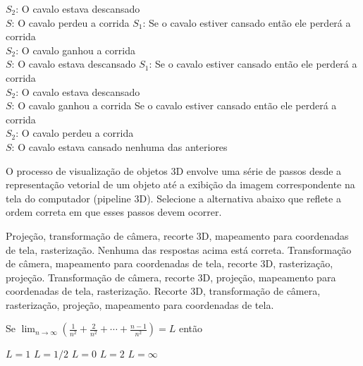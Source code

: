 \documentclass[12pt, addpoints]{exam}
\begin{document}
\begin{questions}
\begin{choices}
              \( S_2 \): O cavalo estava descansado \\

              \( S \): O cavalo perdeu a corrida
\choice \( S_1 \): Se o cavalo estiver cansado então ele perderá a corrida \\

              \( S_2 \): O cavalo ganhou a corrida \\

              \( S \): O cavalo estava descansado
\choice \( S_1 \): Se o cavalo estiver cansado então ele perderá a corrida \\

              \( S_2 \): O cavalo estava descansado \\

              \( S \): O cavalo ganhou a corrida
\choice Se o cavalo estiver cansado então ele perderá a corrida \\

              \( S_2 \): O cavalo perdeu a corrida \\

              \( S \): O cavalo estava cansado
\choice nenhuma das anteriores
\end{choices}

\question

O processo de visualização de objetos 3D envolve uma série de passos desde a representação vetorial de um objeto até a exibição da imagem correspondente na tela do computador (pipeline 3D). Selecione a alternativa abaixo que reflete a ordem correta em que esses passos devem ocorrer. 
\begin{choices}
\choice Projeção, transformação de câmera, recorte 3D, mapeamento para coordenadas de tela, rasterização. 
\choice Nenhuma das respostas acima está correta.
\choice Transformação de câmera, mapeamento para coordenadas de tela, recorte 3D, rasterização, projeção. 
\choice Transformação de câmera, recorte 3D, projeção, mapeamento para coordenadas de tela, rasterização. 
\choice Recorte 3D, transformação de câmera, rasterização, projeção, mapeamento para coordenadas de tela. 
\end{choices}

\question

Se \( \lim_{n \to \infty} \left( \frac{1}{n^2} + \frac{2}{n^2} + \cdots + \frac{n-1}{n^2} \right) = L \) então


\begin{choices}
\choice \( L = 1 \)
\choice \( L = 1/2 \)
\choice \( L = 0 \)
\choice \( L = 2 \)
\choice \( L = \infty \)
\end{choices}


\end{questions}
\end{document}
